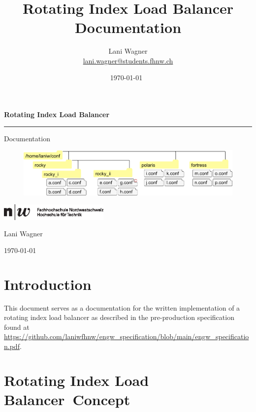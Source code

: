 \documentclass[11pt]{article} %
\title{Rotating Index Load Balancer Documentation}
\author{Lani Wagner\\\href{mailto:lani.wagner@students.fhnw.ch}{lani.wagner@students.fhnw.ch}}
\date{\today\ \currenttime} %
\newcommand{\rilb}{Rotating Index Load Balancer}
\begin{document}
  \begin{titlepage}
    \begin{center}
      \vspace*{1cm}

      \textbf{\Huge \rilb}

      \vspace{1.5cm}
      \hrule
      \vspace{1cm}

      {\Large Documentation}

      \vspace{2.5cm}


      \begin{figure}[H]
        \centering
        \includegraphics[width=.9\linewidth, keepaspectratio]{res/rilb_visualization}
        \label{fig:rilb-vis-title}
      \end{figure}

      \vfill

      \includegraphics[width=0.4\textwidth]{res/fhnw_ht_10mm}

      \vspace{0.8cm}

      Lani Wagner

      \today\ \currenttime

    \end{center}
  \end{titlepage}

  \section*{Introduction}

  This document serves as a documentation for the written implementation of a rotating index load balancer as described in the pre-production specification found at \url{https://github.com/laniwfhnw/engw_specification/blob/main/engw_specification.pdf}.

    {\hypersetup{hidelinks} \tableofcontents}
  \newpage



  \section{\rilb\ Concept}\label{sec:2}
\end{document}
